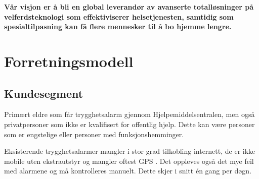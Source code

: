 \textbf{Vår visjon er å bli en global leverandør av avanserte totalløsninger på
  velferdsteknologi som effektiviserer helsetjenesten, samtidig som
spesialtilpasning kan få flere mennesker til å bo hjemme lengre.}

\clearpage

\section{Forretningsmodell}

\subsection{Kundesegment}



%


Primært eldre som får trygghetsalarm gjennom Hjelpemiddelsentralen, men også
privatpersoner som ikke er kvalifisert for offentlig hjelp. Dette kan være
personer som er engstelige eller personer med funksjonshemminger.

Eksisterende trygghetsalarmer mangler i stor grad tilkobling internett, de er
ikke mobile uten ekstrautstyr og mangler oftest GPS \cite{sverige.alarm}.
Det oppleves også det mye feil med alarmene og må kontrolleres manuelt. Dette
skjer i snitt én gang per døgn.

